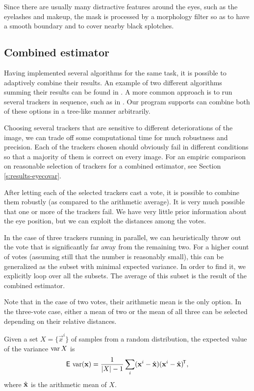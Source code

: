 Since there are usually many distractive features around the eyes, such as the eyelashes and makeup, the mask is processed by a morphology filter so as to have a smooth boundary and to cover nearby black splotches.

\subsection{Combined estimator}

Having implemented several algorithms for the same task, it is possible to adaptively combine their results.
An example of two different algorithms summing their results can be found in \cite{leo14}.
A more common approach is to run several trackers in sequence, such as in \cite{wang16,george16,zhu12}.
Our program supports can combine both of these options in a tree-like manner arbitrarily.

Choosing several trackers that are sensitive to different deteriorations of the image, we can trade off some computational time for much robustness and precision.
Each of the trackers chosen should obviously fail in different conditions so that a majority of them is correct on every image.
For an empiric comparison on reasonable selection of trackers for a combined estimator, see Section \ref{s:results-eyecovar}.

After letting each of the selected trackers cast a vote, it is possible to combine them robustly (as compared to the arithmetic average).
It is very much possible that one or more of the trackers fail.
We have very little prior information about the eye position, but we can exploit the distances among the votes.

In the case of three trackers running in parallel, we can heuristically throw out the vote that is significantly far away from the remaining two.
For a higher count of votes (assuming still that the number is reasonably small), this can be generalized as the subset with minimal expected variance.
In order to find it, we explicitly loop over all the subsets.
The average of this subset is the result of the combined estimator.

Note that in the case of two votes, their arithmetic mean is the only option.
In the three-vote case, either a mean of two or the mean of all three can be selected depending on their relative distances.

\begin{claim}
Given a set $X = \{\vec x^i\}$ of samples from a random distribution, the expected value of the variance $\operatorname{\mathrm{var}} X$ is
$$\operatorname{\textsf{E}\,}\operatorname{\mathrm{var}} (\mathbf{x}) = \frac 1 {|X| - 1} \sum_i (\mathbf{x}^i - \hat{\mathbf{x}})(\mathbf{x}^i - \hat{\mathbf{x}})^{\!\mathsf{T}},$$
where $\hat{\mathbf{x}}$ is the arithmetic mean of $X$.
\end{claim}

